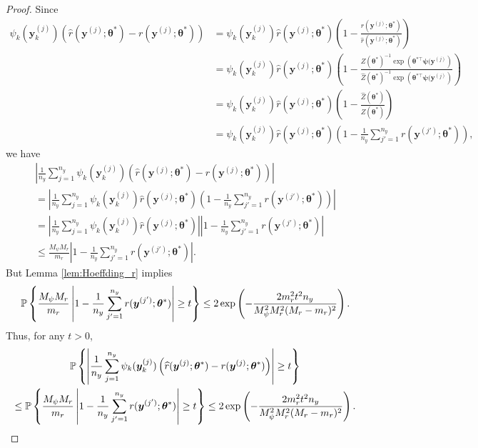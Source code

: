 \documentclass[11pt]{article}
\numberwithin{equation}{section}
\numberwithin{theorem}{section}
\def\faty{\boldsymbol{y}}
\def\fattheta{\boldsymbol{\theta}}
\def\fatpsi{\boldsymbol{\psi}}
\theoremstyle{definition}
\theoremstyle{remark}
\begin{document}
\begin{proof}
Since
\begin{equation}
\begin{aligned}
\psi_k(\faty_k^{(j)}) \left( \hat r(\faty^{(j)};\fattheta^*) - r(\faty^{(j)};\fattheta^*) \right)
&= \psi_k(\faty_k^{(j)}) \hat r(\faty^{(j)};\fattheta^*) \left( 1 - \frac{r(\faty^{(j)};\fattheta^*)}{\hat r(\faty^{(j)};\fattheta^*)} \right) \\
&= \psi_k(\faty_k^{(j)}) \hat r(\faty^{(j)};\fattheta^*) \left( 1 - \frac{Z(\fattheta^*)^{-1} \exp\left( \fattheta^{*\top} \fatpsi(\faty^{(j)} \right)}{\hat Z(\fattheta^*)^{-1} \exp\left( \fattheta^{*\top} \fatpsi(\faty^{(j)} \right)} \right) \\
&= \psi_k(\faty_k^{(j)}) \hat r(\faty^{(j)};\fattheta^*) \left( 1 - \frac{\hat Z(\fattheta^*)}{Z(\fattheta^*)} \right) \\
&= \psi_k(\faty_k^{(j)}) \hat r(\faty^{(j)};\fattheta^*) \left( 1 - \frac{1}{n_y} \sum_{j'=1}^{n_y} r(\faty^{(j')};\fattheta^*) \right),
\end{aligned}
\end{equation}
we have
\begin{multline}
\left| \frac{1}{n_y} \sum_{j=1}^{n_y} \psi_k(\faty_k^{(j)}) \left( \hat r(\faty^{(j)};\fattheta^*) - r(\faty^{(j)};\fattheta^*) \right) \right| \\
= \left| \frac{1}{n_y} \sum_{j=1}^{n_y} \psi_k(\faty_k^{(j)})\hat r(\faty^{(j)};\fattheta^*) \left( 1 - \frac{1}{n_y} \sum_{j'=1}^{n_y} r(\faty^{(j')};\fattheta^*) \right) \right| \\
= \left| \frac{1}{n_y} \sum_{j=1}^{n_y} \psi_k(\faty_k^{(j)})\hat r(\faty^{(j)};\fattheta^*) \right| \left| 1 - \frac{1}{n_y} \sum_{j'=1}^{n_y} r(\faty^{(j')};\fattheta^*) \right| \\
\leq \frac{M_\psi M_r}{m_r} \left| 1 - \frac{1}{n_y} \sum_{j'=1}^{n_y} r(\faty^{(j')};\fattheta^*) \right|.
\end{multline}
But Lemma \ref{lem:Hoeffding_r} implies
\begin{equation}
\PP\left\{ \frac{M_\psi M_r}{m_r} \left| 1 - \frac{1}{n_y} \sum_{j'=1}^{n_y} r(\faty^{(j')};\fattheta^*) \right| \geq t \right\}
\leq 2\exp\left( -\frac{2 m_r^2 t^2 n_y}{M_\psi^2 M_r^2 (M_r - m_r)^2} \right).
\end{equation}
Thus, for any $t > 0$,
\begin{multline}
\PP\left\{ \left| \frac{1}{n_y} \sum_{j=1}^{n_y} \psi_k(\faty_k^{(j)}) \left( \hat r(\faty^{(j)};\fattheta^*) -  r(\faty^{(j)};\fattheta^*) \right) \right| \geq t \right\} \\
\leq \PP\left\{ \frac{M_\psi M_r}{m_r} \left| 1 - \frac{1}{n_y} \sum_{j'=1}^{n_y} r(\faty^{(j')};\fattheta^*) \right| \geq t \right\}
\leq 2\exp\left( -\frac{2 m_r^2 t^2 n_y}{M_\psi^2 M_r^2 (M_r - m_r)^2} \right).
\end{multline}
\end{proof}
\end{document}
